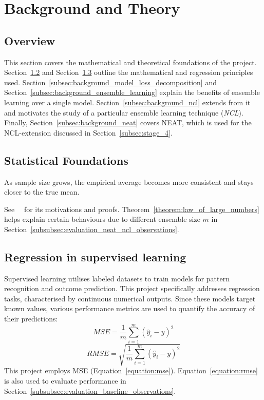 \section{Background and Theory}
\label{sec:background}


\subsection{Overview}
\label{subsec:background_overview}
This section covers the mathematical and theoretical foundations of the project. Section~\ref{subsec:background_statistic} and Section~\ref{subsec:background_regression} outline the mathematical and regression principles used. Section~\ref{subsec:background_model_loss_decomposition} and Section~\ref{subsec:background_ensemble_learning} explain the benefits of ensemble learning over a single model. Section~\ref{subsec:background_ncl} extends from it and motivates the study of a particular ensemble learning technique (\textit{NCL}). Finally, Section~\ref{subsec:background_neat} covers NEAT, which is used for the NCL-extension discussed in Section~\ref{subsec:stage_4}. 


\subsection{Statistical Foundations}
\label{subsec:background_statistic}
\begin{theorem}\label{theorem:law_of_large_numbers}
    As sample size grows, the empirical average becomes more consistent and stays closer to the true mean. 
\end{theorem}
See~\cite{durrett2019probability}~\cite{judd1985law} for its motivations and proofs. Theorem~\ref{theorem:law_of_large_numbers} helps explain certain behaviours due to different ensemble size $m$ in Section~\ref{subsubsec:evaluation_neat_ncl_observations}. 


\subsection{Regression in supervised learning}
\label{subsec:background_regression}
Supervised learning utilises labeled datasets to train models for pattern recognition and outcome prediction. This project specifically addresses regression tasks, characterised by continuous numerical outputs. Since these models target known values, various performance metrics are used to quantify the accuracy of their predictions: 
\begin{equation}
    \label{equation:mse}
    MSE = \frac{1}{m} \sum_{i=1}^{m} (\hat{y}_i - y)^{2}
\end{equation}
\begin{equation}
    \label{equation:rmse}
    RMSE = \sqrt{\frac{1}{m} \sum_{i=1}^{m} (\hat{y}_i - y)^{2}}
\end{equation}
This project employs MSE (Equation~\ref{equation:mse}). Equation~\ref{equation:rmse} is also used to evaluate performance in Section~\ref{subsubsec:evaluation_baseline_observations}. 


